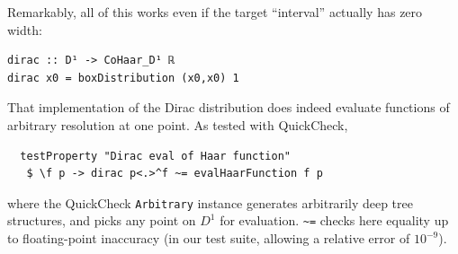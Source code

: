 \documentclass[sigplan,review,anonymous]{acmart}\settopmatter{printfolios=true,printccs=false,printacmref=false}
\begin{document}
Remarkably, all of this works even if the target “interval” actually has zero width:
\begin{lstlisting}
dirac :: D¹ -> CoHaar_D¹ ℝ
dirac x0 = boxDistribution (x0,x0) 1
\end{lstlisting}
That implementation of the Dirac distribution does indeed evaluate functions of arbitrary resolution at one point. As tested with QuickCheck,
\begin{lstlisting}
  testProperty "Dirac eval of Haar function"
   $ \f p -> dirac p<.>^f ~= evalHaarFunction f p
\end{lstlisting}
where the QuickCheck \lstinline`Arbitrary` instance generates arbitrarily deep tree structures, and picks any point on $D^1$ for evaluation. \lstinline`~=` checks here equality up to floating-point inaccuracy (in our test suite, allowing a relative error of $10^{-9}$).
\end{document}
